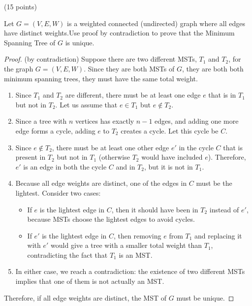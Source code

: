 \documentclass[12pt]{article}
\newcommand{\vs}{\vspace{2mm}}
\begin{document}
 (15 points)
\vs\

Let $G = (V,E,W)$ is a weighted connected (undirected) graph where all edges have distinct weights.Use proof by contradiction to prove that the Minimum Spanning Tree of $G$ is unique. 

\begin{proof} (by contradiction)
    Suppose there are two different MSTs, $T_1$ and $T_2$, for the graph $G = (V, E, W)$. Since they are both MSTs of $G$, they are both both minimum spanning trees, they must have the same total weight.
    
    \begin{enumerate}
        \item Since $T_1$ and $T_2$ are different, there must be at least one edge $e$ that is in $T_1$ but not in $T_2$. Let us assume that $e \in T_1$ but $e \notin T_2$.
        
        \item Since a tree with $n$ vertices has exactly $n-1$ edges, and adding one more edge forms a cycle, adding $e$ to $T_2$ creates a cycle. Let this cycle be $C$. 
        
        \item Since $e \notin T_2$, there must be at least one other edge $e'$ in the cycle $C$ that is present in $T_2$ but not in $T_1$ (otherwise $T_2$ would have included $e$). Therefore, $e'$ is an edge in both the cycle $C$ and in $T_2$, but it is not in $T_1$.
        
        \item Because all edge weights are distinct, one of the edges in $C$ must be the lightest. Consider two cases:
        \begin{itemize}
            \item If $e$ is the lightest edge in $C$, then it should have been in $T_2$ instead of $e'$, because MSTs choose the lightest edges to avoid cycles.
            \item If $e'$ is the lightest edge in $C$, then removing $e$ from $T_1$ and replacing it with $e'$ would give a tree with a smaller total weight than $T_1$, contradicting the fact that $T_1$ is an MST.
        \end{itemize}
        
        \item In either case, we reach a contradiction: the existence of two different MSTs implies that one of them is not actually an MST.
    \end{enumerate}
    
    Therefore, if all edge weights are distinct, the MST of $G$ must be unique.
\end{proof}
\end{document}

